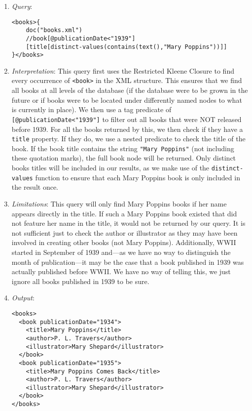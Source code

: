 \documentclass[11pt]{article}
\begin{document}
\begin{enumerate}
\item \textit{Query}:
\begin{small}
\begin{verbatim}
<books>{
    doc("books.xml")
    //book[@publicationDate<"1939"]
    [title[distinct-values(contains(text(),"Mary Poppins"))]]
}</books>
\end{verbatim}
\end{small}

\item \textit{Interpretation}: This query first uses the Restricted Kleene Closure to find every occurrence of \texttt{<book>} in the XML structure. This ensures that we find all books at all levels of the database (if the database were to be grown in the future or if books were to be located under differently named nodes to what is currently in place). We then use a tag predicate of \texttt{[@publicationDate<"1939"]} to filter out all books that were NOT released before 1939. For all the books returned by this, we then check if they have a \texttt{title} property. If they do, we use a nested predicate to check the title of the book. If the book title contains the string \texttt{"Mary Poppins"} (not including these quotation marks), the full book node will be returned. Only distinct books titles will be included in our results, as we make use of the \texttt{distinct-values} function to ensure that each Mary Poppins book is only included in the result once.

\item \textit{Limitations}: This query will only find Mary Poppins books if her name appears directly in the title. If such a Mary Poppins book existed that did not feature her name in the title, it would not be returned by our query. It is not sufficient just to check the author or illustrator as they may have been involved in creating other books (not Mary Poppins). Additionally, WWII started in September of 1939 and---as we have no way to distinguish the month of publication---it may be the case that a book published in 1939 was actually published before WWII. We have no way of telling this, we just ignore all books published in 1939 to be sure.
\item \textit{Output}:
\begin{verbatim}
<books>
  <book publicationDate="1934">
    <title>Mary Poppins</title>
    <author>P. L. Travers</author>
    <illustrator>Mary Shepard</illustrator>
  </book>
  <book publicationDate="1935">
    <title>Mary Poppins Comes Back</title>
    <author>P. L. Travers</author>
    <illustrator>Mary Shepard</illustrator>
  </book>
</books>
\end{verbatim} 
\end{enumerate}
\end{document}
